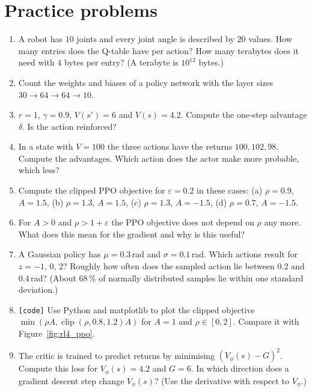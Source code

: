 \section*{Practice problems}
\begin{enumerate}[label=\textbf{\thechapter.\arabic*}]
  \item A robot has $10$ joints and every joint angle is described by $20$ values. How many entries does the Q-table have per action? How many terabytes does it need with $4$ bytes per entry? (A terabyte is $10^{12}$ bytes.)
  \item Count the weights and biases of a policy network with the layer sizes $30\to64\to64\to10$.
  \item $r=1$, $\gamma=0.9$, $V(s')=6$ and $V(s)=4.2$. Compute the one-step advantage $\delta$. Is the action reinforced?
  \item In a state with $V=100$ the three actions have the returns $100,102,98$. Compute the advantages. Which action does the actor make more probable, which less?
  \item Compute the clipped PPO objective for $\varepsilon=0.2$ in these cases: (a) $\rho=0.9$, $A=1.5$, (b) $\rho=1.3$, $A=1.5$, (c) $\rho=1.3$, $A=-1.5$, (d) $\rho=0.7$, $A=-1.5$.
  \item For $A>0$ and $\rho>1+\varepsilon$ the PPO objective does not depend on $\rho$ any more. What does this mean for the gradient and why is this useful?
  \item A Gaussian policy has $\mu=0.3$\,rad and $\sigma=0.1$\,rad. Which actions result for $z=-1,\,0,\,2$? Roughly how often does the sampled action lie between $0.2$ and $0.4$\,rad? (About $68\,\%$ of normally distributed samples lie within one standard deviation.)
  \item \texttt{[code]} Use Python and matplotlib to plot the clipped objective $\min(\rho A,\operatorname{clip}(\rho,0.8,1.2)A)$ for $A=1$ and $\rho\in[0,2]$. Compare it with Figure~\ref{fig:rl4_ppo}.
  \item[\textbf{\thechapter.9}$\star$] The critic is trained to predict returns by minimising $(V_\phi(s)-G)^2$. Compute this loss for $V_\phi(s)=4.2$ and $G=6$. In which direction does a gradient descent step change $V_\phi(s)$? (Use the derivative with respect to $V_\phi$.)
\end{enumerate}
